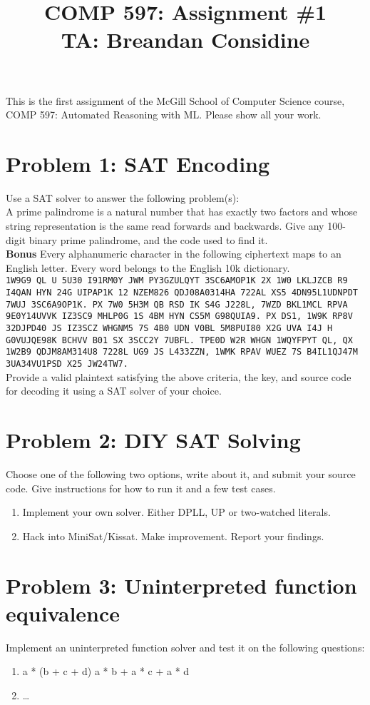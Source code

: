 \documentclass[11pt]{article}
\title{COMP 597: Assignment \#1\\\vspace{10pt}\small{TA: Breandan Considine}}
\begin{document}
    \maketitle
    \noindent This is the first assignment of the McGill School of Computer Science course, COMP 597: Automated Reasoning with ML. Please show all your work.

    \section{Problem 1: SAT Encoding}

    \noindent Use a SAT solver to answer the following problem(s):\\

    \noindent A prime palindrome is a natural number that has exactly two factors and whose string representation is the same read forwards and backwards. Give any 100-digit binary prime palindrome, and the code used to find it.\\

    \noindent \textbf{Bonus} Every alphanumeric character in the following ciphertext maps to an English letter. Every word belongs to the English 10k dictionary.\\

    \noindent \texttt{1W9G9 QL U 5U30 I91RM0Y JWM PY3GZULQYT 3SC6AMOP1K 2X 1W0 LKLJZCB R9 I4QAN HYN 24G UIPAP1K 12 NZEM826 QDJ08A0314HA 722AL XS5 4DN95L1UDNPDT 7WUJ 3SC6A9OP1K. PX 7W0 5H3M QB RSD IK S4G J228L, 7WZD BKL1MCL RPVA 9E0Y14UVVK IZ3SC9 MHLP0G 1S 4BM HYN CS5M G98QUIA9. PX DS1, 1W9K RP8V 32DJPD40 JS IZ3SCZ WHGNM5 7S 4B0 UDN V0BL 5M8PUI80 X2G UVA I4J H G0VUJQE98K BCHVV B01 SX 3SCC2Y 7UBFL. TPE0D W2R WHGN 1WQYFPYT QL, QX 1W2B9 QDJM8AM314U8 7228L UG9 JS L433ZZN, 1WMK RPAV WUEZ 7S B4IL1QJ47M 3UA34VU1PSD X25 JW24TW7.}\\

    \noindent Provide a valid plaintext satisfying the above criteria, the key, and source code for decoding it using a SAT solver of your choice.

    \pagebreak\section{Problem 2: DIY SAT Solving}

    \noindent Choose one of the following two options, write about it, and submit your source code. Give instructions for how to run it and a few test cases.

    \begin{enumerate}
    \item Implement your own solver. Either DPLL, UP or two-watched literals.
    \item Hack into MiniSat/Kissat. Make improvement. Report your findings.
    \end{enumerate}

    \section {Problem 3: Uninterpreted function equivalence}
    \noindent Implement an uninterpreted function solver and test it on the following questions:
    \begin{enumerate}
        \item a * (b + c + d)  a * b + a * c + a * d
        \item \ldots
    \end{enumerate}
\end{document}
